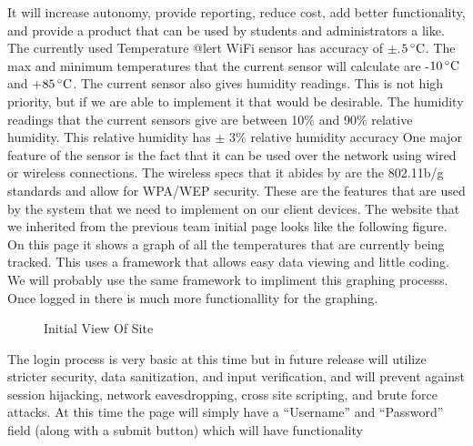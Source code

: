 \documentclass{report}
\begin{document}
It will increase autonomy, provide reporting, reduce cost, add better functionality, 
and provide a product that can be used by students and administrators a like.
\newline
\indent
	The currently used Temperature @lert WiFi sensor has accuracy of $\pm$.$5\,^{\circ}{\rm C}$. The max and minimum temperatures that the current sensor will calculate are -$10\,^{\circ}{\rm C}$ and +$85\,^{\circ}{\rm C}$. 
The current sensor also gives humidity readings. 
This is not high priority, but if we are able to implement it that would be desirable.
 The humidity readings that the current sensors give are between 10$\%$ and 90$\%$ relative humidity. 
This relative humidity has $\pm$ 3$\%$ relative humidity accuracy One major feature of the sensor is the fact that it can be used over the network using wired or wireless connections. 
The wireless specs that it abides by are the 802.11b/g standards and allow for WPA/WEP security. 
These are the features that are used by the system that we need to implement on our client devices.
\newline
\indent
The website that we inherited from the previous team initial page looks like the following figure. 
On this page it shows a graph of all the temperatures that are currently being tracked. 
This uses a framework that allows easy data viewing and little coding. 
We will probably use the same framework to impliment this graphing processs. 
Once logged in there is much more functionallity for the graphing. 
\begin{figure}[H]
\caption{Initial View Of Site}
\end{figure}
\newpage
The login process is very basic at this time but in future release will utilize stricter security, data sanitization, and input verification,
and will prevent against session hijacking, network eavesdropping, cross site scripting, and brute force attacks. 
At this time the page will simply have a “Username” and “Password” field (along with a submit button) which will have functionality
\end{document}
